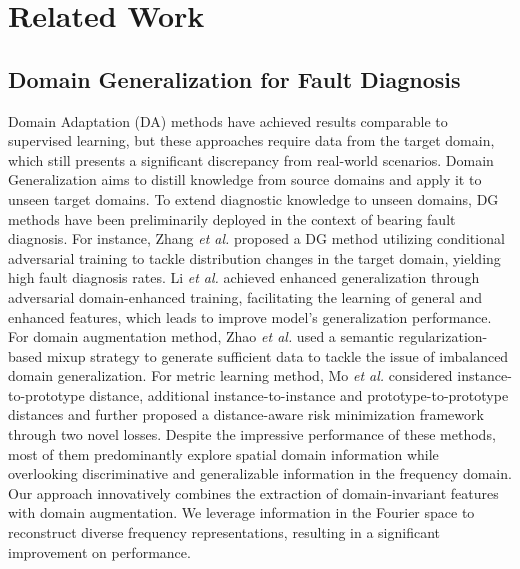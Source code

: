 \section{Related Work}
\subsection{Domain Generalization for Fault Diagnosis}
Domain Adaptation (DA) methods have achieved results comparable to supervised learning, but these approaches require data from the target domain, which still presents a significant discrepancy from real-world scenarios. Domain Generalization aims to distill knowledge from source domains and apply it to unseen target domains. To extend diagnostic knowledge to unseen domains, DG methods\cite{r45, r55, r56} have been preliminarily deployed in the context of bearing fault diagnosis. For instance, Zhang \textit{et al.} \cite{r9} proposed a DG method utilizing conditional adversarial training to tackle distribution changes in the target domain, yielding high fault diagnosis rates. Li \textit{et al.} \cite{r4} achieved enhanced generalization through adversarial domain-enhanced training, facilitating the learning of general and enhanced features, which leads to improve model's generalization performance. For domain augmentation method, Zhao \textit{et al.} \cite{r46} used a semantic regularization-based mixup strategy to generate sufficient data to tackle the issue of imbalanced domain generalization. For metric learning method, Mo \textit{et al.} \cite{r57} considered instance-to-prototype distance, additional instance-to-instance and prototype-to-prototype distances and further proposed a distance-aware risk minimization framework through two novel losses. Despite the impressive performance of these methods, most of them predominantly explore spatial domain information while overlooking discriminative and generalizable information in the frequency domain. Our approach innovatively combines the extraction of domain-invariant features with domain augmentation. We leverage information in the Fourier space to reconstruct diverse frequency representations, resulting in a significant improvement on performance.

